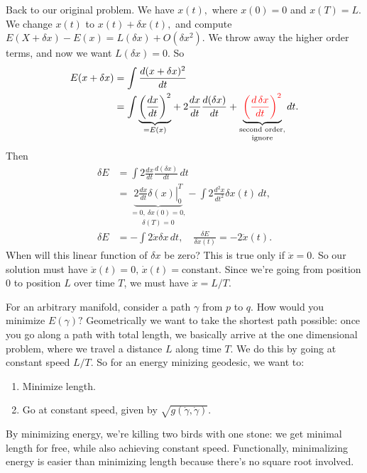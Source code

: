 Back to our original problem. We have $x(t),$ where $x(0)=0$ and $x(T)=L$. We change $x(t)$ to $x(t)+\delta x(t),$ and compute $E(X+\delta x)-E(x)=L (\delta x)+O(\delta x^2)$. We throw away the higher order terms, and now we want $L(\delta x)=0$. So 
\begin{align*}
    E(x+\delta x)&= \int \frac{d(x+\delta x)^2}{dt} \\
                 &= \int\underset{=E(x)}{\underbrace{\left( \frac{dx}{dt} \right) ^2}} +2 \frac{dx}{dt}\frac{d(\delta x)}{dt}+\underset{\text{ignore}}{\underset{\text{second order,}}{\underbrace{ {\color{red}\left( \frac{d\, \delta x}{dt} \right) ^2}} }}   \, dt.\\
\end{align*}
Then
\begin{align*}
    \delta E&= \int 2 \frac{dx}{dt}\frac{d(\delta x)}{dt} \, dt\\
            &=\underset{\delta (T)=0}{\underset{=0,\ \delta x(0)=0,}{\underbrace{ \left. 2 \frac{dx}{dt}\delta (x) \right| ^T_0}} } - \int 2 \frac{d^2 x}{dt^2}\delta x(t) \, dt,\\
    \delta E &= - \int 2 \ddot x \delta x\, dt,\quad \frac{\delta E}{\delta x(t)}=-2 \ddot x(t).
\end{align*} When will this linear function of $\delta x$ be zero? This is true only if $\ddot x=0$. So our solution must have $\ddot x(t)=0, \, \dot x(t)= \text{constant} .$ Since we're going from position 0 to position $L$ over time $T$, we must have $\dot x= L /T$. 

For an arbitrary manifold, consider a path $\gamma $ from $p$ to $q$. How would you minimize $E (\gamma )?$ Geometrically we want to take the shortest path possible: once you go along a path with total length, we basically arrive at the one dimensional problem, where we travel a distance $L$ along time $T$. We do this by going at constant speed $L /T$. So for an energy minizing geodesic, we want to:
\begin{enumerate}[label=(\arabic*)]
    \setlength\itemsep{-.2em}
    \item Minimize length.
        \item Go at constant speed, given by $\sqrt{g(\dot \gamma ,\dot \gamma )} $.
\end{enumerate}
By minimizing energy, we're killing two birds with one stone: we get minimal length for free, while also achieving constant speed. Functionally, minimalizing energy is easier than minimizing length because there's no square root involved.

